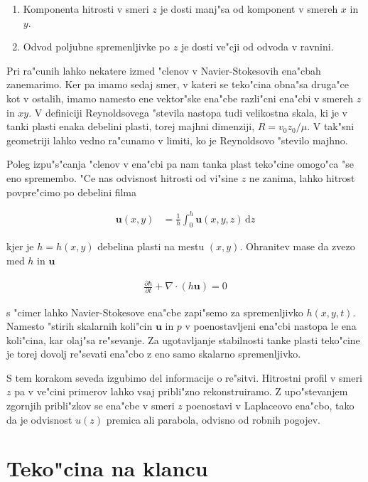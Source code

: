 \documentclass[a4paper,12pt]{article}
\renewcommand{\vec}{\mathbf}
\newcommand{\dd}{\,\mathrm{d}}
\begin{document}
\begin{enumerate}
  \item Komponenta hitrosti v smeri $z$ je dosti manj"sa od komponent v smereh $x$ in $y$. 
  \item Odvod poljubne spremenljivke po $z$ je dosti ve"cji od odvoda v ravnini. 
\end{enumerate}

Pri ra"cunih lahko nekatere izmed "clenov v Navier-Stokesovih ena"cbah zanemarimo. Ker pa imamo sedaj smer, v kateri se teko"cina obna"sa druga"ce kot v ostalih, imamo namesto ene vektor"ske ena"cbe razli"cni ena"cbi v smereh $z$ in $xy$. V definiciji Reynoldsovega "stevila nastopa tudi velikostna skala, ki je v tanki plasti enaka debelini plasti, torej majhni dimenziji, $R = v_0 z_0/\mu$. V tak"sni geometriji lahko vedno ra"cunamo v limiti, ko je Reynoldsovo "stevilo majhno. 

Poleg izpu"s"canja "clenov v ena"cbi pa nam tanka plast teko"cine omogo"ca "se eno spremembo. "Ce nas odvisnost hitrosti od vi"sine $z$ ne zanima, lahko hitrost povpre"cimo po debelini filma

\begin{align}
 \vec u(x,y) &=  \frac{1}{h}\int_0^h \vec u(x,y,z)\dd z
\end{align}

kjer je $h = h(x,y)$ debelina plasti na mestu $(x,y)$. Ohranitev mase da zvezo med $h$ in $\vec u$

\begin{align}
  \frac{\partial h}{\partial t} + \nabla\cdot(h\vec u) = 0
\end{align}

s "cimer lahko Navier-Stokesove ena"cbe zapi"semo za spremenljivko $h(x,y,t)$. Namesto "stirih skalarnih koli"cin $\vec u$ in $p$ v poenostavljeni ena"cbi nastopa le ena koli"cina, kar olaj"sa re"sevanje. Za ugotavljanje stabilnosti tanke plasti teko"cine je torej dovolj re"sevati ena"cbo z eno samo skalarno spremenljivko. 

S tem korakom seveda izgubimo del informacije o re"sitvi. Hitrostni profil v smeri $z$ pa v ve"cini primerov lahko vsaj pribli"zno rekonstruiramo. Z upo"stevanjem zgornjih pribli"zkov se ena"cbe v smeri $z$ poenostavi v Laplaceovo ena"cbo, tako da je odvisnost $u(z)$ premica ali parabola, odvisno od robnih pogojev. 

\section{Teko"cina na klancu}
\end{document}
